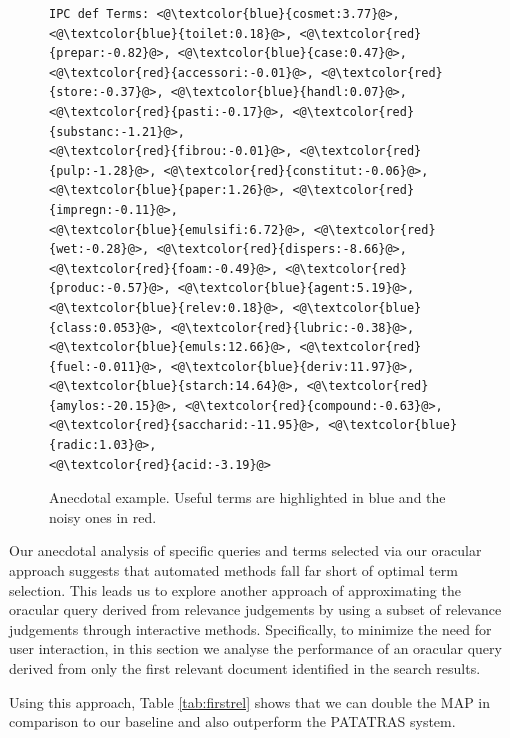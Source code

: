 \begin{figure}[t!]
\begin{framed}
\begin{lstlisting}[basicstyle=\tiny\ttfamily , linewidth=\columnwidth,breaklines=true]
IPC def Terms: <@\textcolor{blue}{cosmet:3.77}@>, <@\textcolor{blue}{toilet:0.18}@>, <@\textcolor{red}{prepar:-0.82}@>, <@\textcolor{blue}{case:0.47}@>, 
<@\textcolor{red}{accessori:-0.01}@>, <@\textcolor{red}{store:-0.37}@>, <@\textcolor{blue}{handl:0.07}@>, <@\textcolor{red}{pasti:-0.17}@>, <@\textcolor{red}{substanc:-1.21}@>, 
<@\textcolor{red}{fibrou:-0.01}@>, <@\textcolor{red}{pulp:-1.28}@>, <@\textcolor{red}{constitut:-0.06}@>, <@\textcolor{blue}{paper:1.26}@>, <@\textcolor{red}{impregn:-0.11}@>, 
<@\textcolor{blue}{emulsifi:6.72}@>, <@\textcolor{red}{wet:-0.28}@>, <@\textcolor{red}{dispers:-8.66}@>, <@\textcolor{red}{foam:-0.49}@>, <@\textcolor{red}{produc:-0.57}@>, <@\textcolor{blue}{agent:5.19}@>, 
<@\textcolor{blue}{relev:0.18}@>, <@\textcolor{blue}{class:0.053}@>, <@\textcolor{red}{lubric:-0.38}@>, <@\textcolor{blue}{emuls:12.66}@>, <@\textcolor{red}{fuel:-0.011}@>, <@\textcolor{blue}{deriv:11.97}@>, 
<@\textcolor{blue}{starch:14.64}@>, <@\textcolor{red}{amylos:-20.15}@>, <@\textcolor{red}{compound:-0.63}@>, <@\textcolor{red}{saccharid:-11.95}@>, <@\textcolor{blue}{radic:1.03}@>, 
<@\textcolor{red}{acid:-3.19}@> 
 \end{lstlisting} 
 \vspace*{-2ex}
\end{framed}
 \vspace*{-2ex}
  \caption{Anecdotal example. Useful terms are highlighted in blue and the noisy ones in red.}
  \label{fig:anecdotal}  
\end{figure}

Our anecdotal analysis of specific queries and terms selected via our oracular
approach suggests that automated methods fall far short of optimal term selection.
This leads us to explore another approach of approximating the oracular query
derived from relevance judgements by using a subset of relevance judgements
through interactive methods.  Specifically, to minimize the need for user interaction,
in this section we analyse the performance of an oracular query derived from
only the first relevant document identified in the search results.

Using this approach, Table \ref{tab:firstrel} shows that we can double the MAP in comparison to our baseline and also outperform the PATATRAS system.

